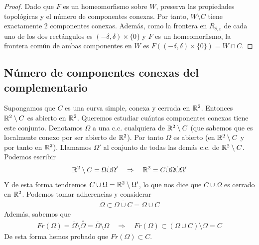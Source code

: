 \begin{lema}
\begin{proof}
        Dado que $F$ es un homeomorfismo sobre $W$, preserva las propiedades topológicas y el número de componentes conexas. Por tanto, $W \setminus C$ tiene exactamente 2 componentes conexas. Además, como la frontera en $R_{\delta,\varepsilon}$ de cada uno de los dos rectángulos es $(-\delta, \delta) \times \{0\}$ y $F$ es un homeomorfismo, la frontera común de ambas componentes en $W$ es $F((-\delta, \delta) \times \{0\}) = W\cap C$.
    \end{proof}
\end{lema}

\subsection{Número de componentes conexas del complementario}

\begin{observacion}
    Supongamos que $C$ es una curva simple, conexa y cerrada en $\mathbb{R}^2$. Entonces $\mathbb{R}^2 \setminus C$ es abierto en $\mathbb{R}^2$. Queremos estudiar cuántas componentes conexas tiene este conjunto. Denotamos $\Omega$ a una c.c. cualquiera de $\mathbb{R}^2 \setminus C$ (que sabemos que es localmente conexo por ser abierto de $\mathbb{R}^2$). Por tanto $\Omega$ es abierto (en $\mathbb{R}^2\setminus C$ y por tanto en $\mathbb{R}^2$). Llamamos $\Omega'$ al conjunto de todas las demás c.c. de $\mathbb{R}^2 \setminus C$. Podemos escribir
    \begin{gather*}
        \mathbb{R}^2 \setminus C = \Omega \dot{\cup} \Omega' \quad \Rightarrow \quad \mathbb{R}^2 = C \dot{\cup} \Omega \dot{\cup} \Omega'
    \end{gather*}
    Y de esta forma tendremos $C\cup \Omega = \mathbb{R}^2 \setminus \Omega'$, lo que nos dice que $C\cup \Omega$ es cerrado en $\mathbb{R}^2$. Podemos tomar adherencias y considerar
    \begin{gather*}
        \overline{\Omega} \subset \overline{\Omega \cup C} = \Omega \cup C 
    \end{gather*}
    Además, sabemos que 
    \begin{gather*}
        Fr(\Omega) = \overline{\Omega} \setminus \overset{\circ}{\Omega} = \overline{\Omega} \setminus \Omega \quad \Rightarrow \quad Fr(\Omega) \subset (\Omega \cup C)\setminus \Omega = C
    \end{gather*}
    De esta forma hemos probado que $Fr(\Omega) \subset C$.\\


\end{observacion}
